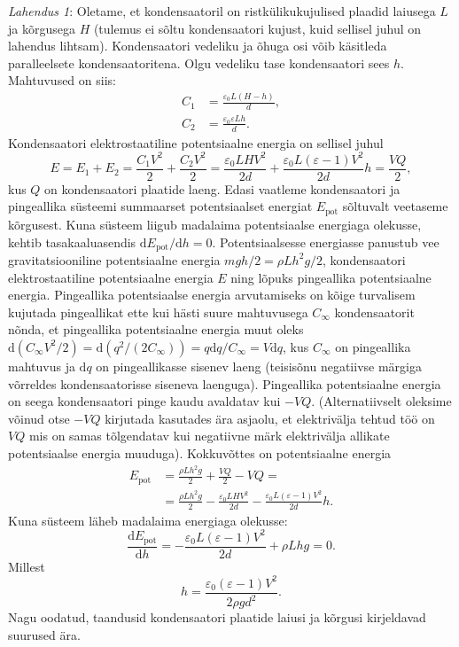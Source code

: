 \documentclass[11pt,a5paper]{article}
\begin{document}
\textit{Lahendus 1}:
Oletame, et kondensaatoril on ristkülikukujulised plaadid laiusega $L$ ja kõrgusega $H$ (tulemus ei sõltu kondensaatori kujust, kuid sellisel juhul on lahendus lihtsam). Kondensaatori vedeliku ja õhuga osi võib käsitleda paralleelsete kondensaatoritena. Olgu vedeliku tase kondensaatori sees $h$. Mahtuvused on siis:
\begin{align*}
C_1 &= \frac{\varepsilon_0 L (H-h)}{d},\\
C_2 &= \frac{\varepsilon_0 \varepsilon L h}{d}.
\end{align*}
Kondensaatori elektrostaatiline potentsiaalne energia on sellisel juhul $$E = E_1 + E_2 = \frac{C_ 1 V^2}{2} + \frac{C_ 2 V^2}{2} = \frac{\varepsilon_0 L H V^2}{2d} + \frac{\varepsilon_0 L (\varepsilon - 1) V^2}{2d}h = \frac{VQ}{2},$$
kus $Q$ on kondensaatori plaatide laeng. Edasi vaatleme kondensaatori ja pingeallika süsteemi summaarset potentsiaalset energiat $E_\mathrm{pot}$ sõltuvalt veetaseme kõrgusest. Kuna süsteem liigub madalaima potentsiaalse energiaga olekusse, kehtib tasakaaluasendis $\mathrm{d} E_\mathrm{pot} / \mathrm{d}h = 0$. Potentsiaalsesse energiasse panustub vee gravitatsiooniline potentsiaalne energia $mgh/2 = \rho L h^2 g/2$, kondensaatori elektrostaatiline potentsiaalne energia $E$ ning lõpuks pingeallika potentsiaalne energia. Pingeallika potentsiaalse energia arvutamiseks on kõige turvalisem kujutada pingeallikat ette kui hästi suure mahtuvusega $C_\infty$ kondensaatorit nõnda, et pingeallika potentsiaalne energia muut oleks $\mathrm{d}(C_\infty V^2/2) = \mathrm{d}(q^2/(2C_\infty)) = q\mathrm{d}q/C_\infty = V\mathrm{d}q$, kus $C_\infty$ on pingeallika mahtuvus ja $\mathrm{d}q$ on pingeallikasse sisenev laeng (teisisõnu negatiivse märgiga võrreldes kondensaatorisse siseneva laenguga). Pingeallika potentsiaalne energia on seega kondensaatori pinge kaudu avaldatav kui $-VQ$. (Alternatiivselt oleksime võinud otse $-VQ$ kirjutada kasutades ära asjaolu, et elektrivälja tehtud töö on $VQ$ mis on samas tõlgendatav kui negatiivne märk elektrivälja allikate potentsiaalse energia muuduga). Kokkuvõttes on potentsiaalne energia
\begin{align*}
E_\mathrm{pot} &=  \frac{\rho L h^2 g}{2} + \frac{VQ}{2} - VQ =\\
&=\frac{\rho L h^2 g}{2} -\frac{\varepsilon_0 L H V^2}{2d} - \frac{\varepsilon_0 L (\varepsilon - 1) V^2}{2d}h.
\end{align*}
Kuna süsteem läheb madalaima energiaga olekusse:
\[
\frac{\mathrm{d}E_\mathrm{pot}}{\mathrm{d}h} = -\frac{\varepsilon_0 L (\varepsilon - 1) V^2}{2d} + \rho L h g = 0.
\]
Millest
\[
  h = \frac{\varepsilon_0 (\varepsilon - 1) V^2}{2 \rho g d^2}.
\]
Nagu oodatud, taandusid kondensaatori plaatide laiusi ja kõrgusi kirjeldavad suurused ära.
\end{document}

